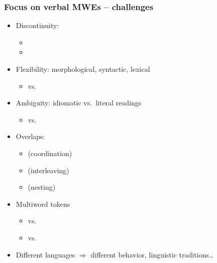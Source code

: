 \documentclass[xcolor=dvipsnames]{beamer}
\begin{document}
\begin{frame}
\begin{scriptsize}
\begin{tabular}{|l|p{5.4cm}|p{1.8cm}|}
\end{tabular}
\end{scriptsize}

\end{frame}

\begin{frame} 
\frametitle{Focus on \textbf{verbal} MWEs -- challenges}

\begin{scriptsize}
\begin{itemize}
\item Discontinuity:
	\begin{itemize}
	\item[]  
	\item[]  
    	\end{itemize}
\item Flexibility: morphological, syntactic, lexical
	\begin{itemize}
	\item[]   vs.~
	\end{itemize}
\item Ambiguity: idiomatic vs.~literal readings
	\begin{itemize}
	\item[]   vs. 
	\end{itemize}
\item Overlaps:
   	\begin{itemize}
	\item[]   (coordination)
	\item[]   (interleaving)
	\item[]   (nesting)
	\end{itemize}
\item Multiword tokens
	\begin{itemize}
	\item[]    vs. 
	\item[]    vs. 
	\end{itemize}
\item Different languages $\Rightarrow$ different behavior, linguistic traditions\ldots
\end{itemize}
\end{scriptsize}

\end{frame}
\end{document}
